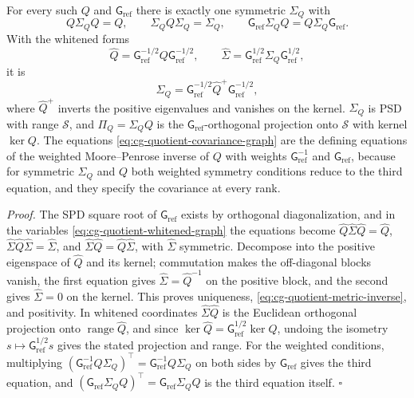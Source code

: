 For every such \(Q\) and \(\mathsf G_{\mathrm{ref}}\) there is exactly one
symmetric \(\Sigma_Q\) with
\begin{equation}
Q\Sigma_QQ=Q,\qquad \Sigma_QQ\Sigma_Q=\Sigma_Q,\qquad
\mathsf G_{\mathrm{ref}}\Sigma_QQ=Q\Sigma_Q\mathsf G_{\mathrm{ref}}.
\label{eq:cg-quotient-covariance-graph}
\end{equation}
With the whitened forms
\begin{equation}
\widehat Q=\mathsf G_{\mathrm{ref}}^{-1/2}Q\mathsf G_{\mathrm{ref}}^{-1/2},\qquad
\widehat\Sigma=\mathsf G_{\mathrm{ref}}^{1/2}\Sigma_Q\mathsf G_{\mathrm{ref}}^{1/2},
\label{eq:cg-quotient-whitened-graph}
\end{equation}
it is
\begin{equation}
\Sigma_Q=\mathsf G_{\mathrm{ref}}^{-1/2}\widehat Q^+\mathsf G_{\mathrm{ref}}^{-1/2},
\label{eq:cg-quotient-metric-inverse}
\end{equation}
where \(\widehat Q^+\) inverts the positive eigenvalues and vanishes on the
kernel. \(\Sigma_Q\) is PSD with range \(\mathcal S\), and
\(\Pi_Q=\Sigma_QQ\) is the \(\mathsf G_{\mathrm{ref}}\)-orthogonal projection onto
\(\mathcal S\) with kernel \(\ker Q\). The equations
\eqref{eq:cg-quotient-covariance-graph} are the defining equations of the
weighted Moore--Penrose inverse of \(Q\) with weights
\(\mathsf G_{\mathrm{ref}}^{-1}\) and \(\mathsf G_{\mathrm{ref}}\), because for
symmetric \(\Sigma_Q\) and \(Q\) both weighted symmetry conditions reduce to the
third equation, and they specify the covariance at every rank.

\noindent\emph{Proof.}
The SPD square root of \(\mathsf G_{\mathrm{ref}}\) exists by orthogonal
diagonalization, and in the variables \eqref{eq:cg-quotient-whitened-graph} the
equations become \(\widehat Q\widehat\Sigma\widehat Q=\widehat Q\),
\(\widehat\Sigma\widehat Q\widehat\Sigma=\widehat\Sigma\), and
\(\widehat\Sigma\widehat Q=\widehat Q\widehat\Sigma\), with \(\widehat\Sigma\)
symmetric. Decompose into the positive eigenspace of \(\widehat Q\) and its
kernel; commutation makes the off-diagonal blocks vanish, the first equation
gives \(\widehat\Sigma=\widehat Q^{-1}\) on the positive block, and the second
gives \(\widehat\Sigma=0\) on the kernel. This proves uniqueness,
\eqref{eq:cg-quotient-metric-inverse}, and positivity. In whitened coordinates
\(\widehat\Sigma\widehat Q\) is the Euclidean orthogonal projection onto
\(\operatorname{range}\widehat Q\), and since
\(\ker\widehat Q=\mathsf G_{\mathrm{ref}}^{1/2}\ker Q\), undoing the isometry
\(s\mapsto\mathsf G_{\mathrm{ref}}^{1/2}s\) gives the stated projection and range.
For the weighted conditions, multiplying
\((\mathsf G_{\mathrm{ref}}^{-1}Q\Sigma_Q)^\top=\mathsf G_{\mathrm{ref}}^{-1}Q\Sigma_Q\)
on both sides by \(\mathsf G_{\mathrm{ref}}\) gives the third equation, and
\((\mathsf G_{\mathrm{ref}}\Sigma_QQ)^\top=\mathsf G_{\mathrm{ref}}\Sigma_QQ\) is the
third equation itself. \(\square\)

